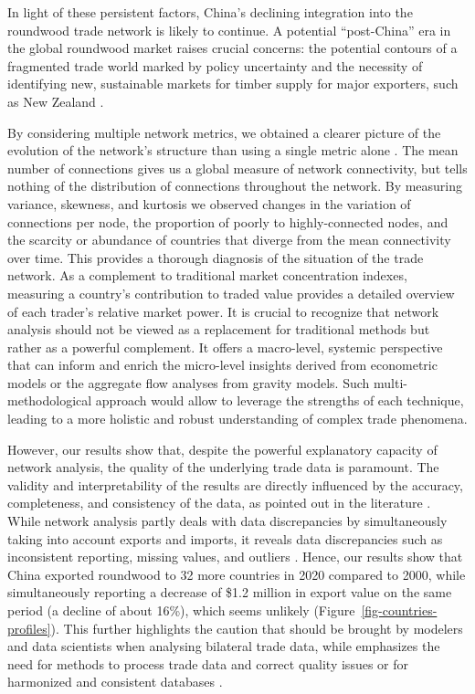 \documentclass[
  authoryear,
  review,
  3p]{elsarticle}
\begin{document}
In light of these persistent factors, China's declining integration into
the roundwood trade network is likely to continue. A potential
``post-China'' era in the global roundwood market raises crucial
concerns: the potential contours of a fragmented trade world marked by
policy uncertainty
\citep{attinasi_navigating_2024, world_trade_organization_global_2025}
and the necessity of identifying new, sustainable markets for timber
supply for major exporters, such as New Zealand
\citep{villamor_preparing_2024}.

By considering multiple network metrics, we obtained a clearer picture
of the evolution of the network's structure than using a single metric
alone \citep{shanafelt_-it-yourself_2017, salau_taking_2022}. The mean
number of connections gives us a global measure of network connectivity,
but tells nothing of the distribution of connections throughout the
network. By measuring variance, skewness, and kurtosis we observed
changes in the variation of connections per node, the proportion of
poorly to highly-connected nodes, and the scarcity or abundance of
countries that diverge from the mean connectivity over time. This
provides a thorough diagnosis of the situation of the trade network. As
a complement to traditional market concentration indexes, measuring a
country's contribution to traded value provides a detailed overview of
each trader's relative market power. It is crucial to recognize that
network analysis should not be viewed as a replacement for traditional
methods but rather as a powerful complement. It offers a macro-level,
systemic perspective that can inform and enrich the micro-level insights
derived from econometric models or the aggregate flow analyses from
gravity models. Such multi-methodological approach would allow to
leverage the strengths of each technique, leading to a more holistic and
robust understanding of complex trade phenomena.

However, our results show that, despite the powerful explanatory
capacity of network analysis, the quality of the underlying trade data
is paramount. The validity and interpretability of the results are
directly influenced by the accuracy, completeness, and consistency of
the data, as pointed out in the literature
\citep{lovric_social_2018, wang_exploratory_2020, zhou_spatial_2021, huang_static_2024}.
While network analysis partly deals with data discrepancies by
simultaneously taking into account exports and imports, it reveals data
discrepancies such as inconsistent reporting, missing values, and
outliers \citep{kallio_reliability_2018, chen_advancing_2022}. Hence,
our results show that China exported roundwood to 32 more countries in
2020 compared to 2000, while simultaneously reporting a decrease of
\$1.2 million in export value on the same period (a decline of about
16\%), which seems unlikely (Figure~\ref{fig-countries-profiles}). This
further highlights the caution that should be brought by modelers and
data scientists when analysing bilateral trade data, while emphasizes
the need for methods to process trade data and correct quality issues or
for harmonized and consistent databases
\citep{gaulier_baci_2010, rougieux_forest_2017}.
\end{document}
